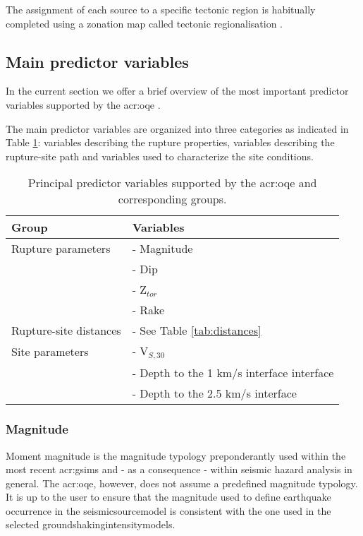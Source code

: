 The assignment of each source to a specific tectonic region is habitually 
completed using a zonation map called tectonic regionalisation 
\parencite[see for example][]{delavaud2012}.

%
\subsection{Main predictor variables}
In the current section we offer a brief overview of the most 
important predictor variables supported by the \gls{acr:oqe}
\parencite[for general a summary, see][]{akkar2013r}. 

The main predictor variables are organized into three categories as indicated in
Table \ref{tab:parameters}: variables describing the rupture properties,
variables describing the rupture\--site path and variables used to characterize
the site conditions. 
\begin{table}[!h]
\centering
\caption{Principal predictor variables supported by the \gls{acr:oqe} and 
    corresponding groups.}
\begin{tabular}{|p{5cm}p{8cm}|}
\hline
\rowcolor{anti-flashwhite}
\bf{Group} & \bf{Variables} \\
\hline 
Rupture parameters & - Magnitude\\
                   & - Dip \\ 
                   & - Z$_{tor}$ \\ 
                   & - Rake \\ \hline
Rupture-site distances & - See Table \ref{tab:distances} \\ \hline
Site parameters & - V$_{S,30}$ \\
                & - Depth to the 1 km/s interface interface \\
                & - Depth to the 2.5 km/s interface \\ 
\hline
\end{tabular}
\label{tab:parameters}
\end{table}
%
\subsubsection{Magnitude}
Moment magnitude \parencite{hanks1979} is the magnitude typology 
preponderantly used within the most recent \glspl{acr:gsim} and - as a 
consequence - within seismic hazard analysis in general. 
%
The \gls{acr:oqe}, however, does not assume a predefined magnitude typology.
It is up to the user to ensure that the magnitude used to define earthquake 
occurrence in the \gls{seismicsourcemodel} is consistent with the one used 
in the selected \glspl{groundshakingintensitymodel}.
%
